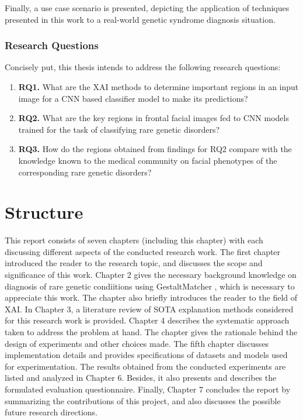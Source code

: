 \documentclass[../report.tex]{subfiles}
\begin{document}
 	Finally, a use case scenario is presented, depicting the application of techniques presented in this work to a real-world genetic syndrome diagnosis situation.
 	
 	 
 	\subsubsection{Research Questions} \label{sec_rq}
 	Concisely put, this thesis intends to address the following research questions:%
 	\begin{enumerate}
 		\item [] \textbf{RQ1.} What are the XAI methods to determine important regions in an input image for a CNN based classifier model to make its predictions?  
 		\item [] \textbf{RQ2.} What are the key regions in frontal facial images fed to CNN models trained for the task of classifying rare genetic disorders?
 		\item [] \textbf{RQ3.} How do the regions obtained from findings for RQ2 compare with the knowledge known to the medical community on facial phenotypes of the corresponding rare genetic disorders? 
 	\end{enumerate}
 
 	\section{Structure}
 	This report consists of seven chapters (including this chapter) with each discussing different aspects of the conducted research work. The first chapter introduced the reader to the research topic, and discusses the scope and significance of this work. Chapter 2 gives the necessary background knowledge on diagnosis of rare genetic condiitions using GestaltMatcher \cite{hsieh2022gestaltmatcher}, which is necessary to appreciate this work. The chapter also briefly introduces the reader to the field of XAI. In Chapter 3, a literature review of SOTA explanation methods considered for this research work is provided. Chapter 4 describes the systematic approach taken to address the problem at hand. The chapter gives the rationale behind the design of experiments and other choices made. The fifth chapter discusses implementation details and provides specifications of datasets and models used for experimentation. The results obtained from the conducted experiments are listed and analyzed in Chapter 6. Besides, it also presents and describes the formulated evaluation questionnaire. Finally, Chapter 7 concludes the report by summarizing the contributions of this project, and also discusses the possible future research directions. 
 	
 	
\end{document}
